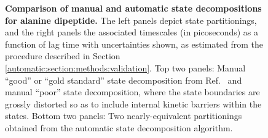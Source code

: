 \begin{figure}[tb]
  \begin{center}
  \end{center}
  \caption{{\bf Comparison of manual and automatic state decompositions for alanine dipeptide.}  
  The left panels depict state partitionings, and the right panels the associated timescales (in picoseconds) as a function of lag time with uncertainties shown, as estimated from the procedure described in Section \ref{automatic:section:methods:validation}.
  Top two panels: Manual ``good'' or ``gold standard'' state decomposition from Ref.\ \cite{chodera:mms:2006} and manual ``poor'' state decomposition, where the state boundaries are grossly distorted so as to include internal kinetic barriers within the states.
  Bottom two panels: Two nearly-equivalent partitionings obtained from the automatic state decomposition algorithm.
  }
  \label{automatic:figure:alanine-dipeptide-manual-vs-automatic}
\end{figure}

